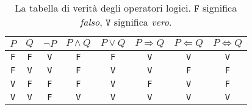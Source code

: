 \begin{table}
\begin{center}
  \begin{tabular}{cc|cccccc}
    $P$ & $Q$ & $\neg P$ & $P\land Q$ & $P\lor Q$ & $P\Rightarrow Q$ &
    $P\Leftarrow Q$ & $P\Leftrightarrow Q$ \\\hline
    \texttt{F} & \texttt{F} & \texttt{V} & \texttt{F} & \texttt{F} & \texttt{V} & \texttt{V} & \texttt{V} \\
    \texttt{F} & \texttt{V} & \texttt{V} & \texttt{F} & \texttt{V} & \texttt{V} & \texttt{F} & \texttt{F} \\
    \texttt{V} & \texttt{F} & \texttt{F} & \texttt{F} & \texttt{V} & \texttt{F} & \texttt{V} & \texttt{F} \\
    \texttt{V} & \texttt{V} & \texttt{F} & \texttt{V} & \texttt{V} & \texttt{V} & \texttt{V} & \texttt{V} \\
    \end{tabular}
\end{center}
\caption{La tabella di verità degli operatori logici. 
$\texttt{F}$ significa \emph{falso}, $\texttt{V}$ significa \emph{vero}.}
\label{tab:verita_operatori_logici}
\end{table}

